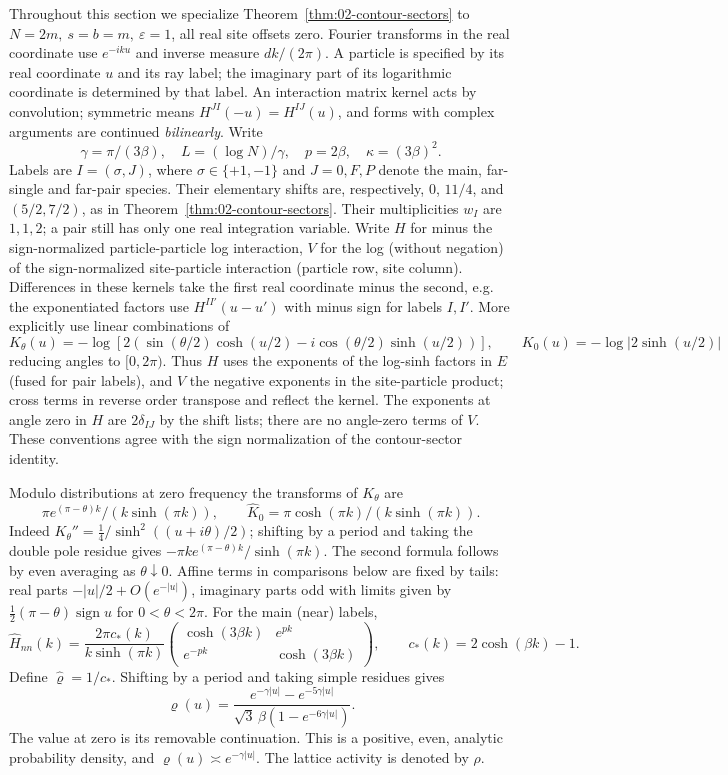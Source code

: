 Throughout this section we specialize Theorem~\ref{thm:02-contour-sectors} to \(N=2m,\ s=b=m,\ \varepsilon=1\), all real site offsets zero. Fourier transforms in the real coordinate use \(e^{-iku}\) and inverse measure \(dk/(2\pi)\). A particle is specified by its real coordinate \(u\) and its ray label; the imaginary part of its logarithmic coordinate is determined by that label. An interaction matrix kernel acts by convolution; symmetric means \(H^{JI}(-u)=H^{IJ}(u)\), and forms with complex arguments are continued \emph{bilinearly}. Write
\[
 \gamma=\pi/(3\beta),\quad L=(\log N)/\gamma,\quad
 p=2\beta,\quad \kappa=(3\beta)^2 .
\]
Labels are \(I=(\sigma,J)\), where \(\sigma\in\{+1,-1\}\) and \(J=0,F,P\) denote the main, far-single and far-pair species. Their elementary shifts are, respectively, \(0\), \(11/4\), and \((5/2,7/2)\), as in Theorem~\ref{thm:02-contour-sectors}. Their multiplicities \(w_I\) are \(1,1,2\); a pair still has only one real integration variable. Write \(H\) for minus the sign-normalized particle-particle log interaction, \(V\) for the log (without negation) of the sign-normalized site-particle interaction (particle row, site column). Differences in these kernels take the first real coordinate minus the second, e.g. the exponentiated factors use \(H^{I I'}(u-u')\) with minus sign for labels \(I,I'\). More explicitly use linear combinations of
\[
 K_\theta(u)=-\log[2(\sin(\theta/2)\cosh(u/2)-i\cos(\theta/2)\sinh(u/2))],\qquad
 K_0(u)=-\log|2\sinh(u/2)|
\]
reducing angles to \([0,2\pi)\). Thus \(H\) uses the exponents of the log-sinh factors in \(E\) (fused for pair labels), and \(V\) the negative exponents in the site-particle product; cross terms in reverse order transpose and reflect the kernel. The exponents at angle zero in \(H\) are \(2\delta_{IJ}\) by the shift lists; there are no angle-zero terms of \(V\). These conventions agree with the sign normalization of the contour-sector identity.

Modulo distributions at zero frequency the transforms of \(K_\theta\) are
\[
 \pi e^{(\pi-\theta)k}/(k\sinh(\pi k)),\qquad
 \widehat K_0=\pi\cosh(\pi k)/(k\sinh(\pi k)).
\]
Indeed \(K_\theta''=\tfrac14/\sinh^2((u+i\theta)/2)\); shifting by a period and taking the double pole residue gives \(-\pi k e^{(\pi-\theta)k}/\sinh(\pi k)\). The second formula follows by even averaging as \(\theta\downarrow0\). Affine terms in comparisons below are fixed by tails: real parts \(-|u|/2+O(e^{-|u|})\), imaginary parts odd with limits given by \(\tfrac12(\pi-\theta)\operatorname{sign}u\) for \(0<\theta<2\pi\). For the main (near) labels,
\[
 \widehat H_{nn}(k)=\frac{2\pi c_*(k)}{k\sinh(\pi k)}
 \begin{pmatrix}\cosh(3\beta k)& e^{pk}\\ e^{-pk}&\cosh(3\beta k)\end{pmatrix},
 \qquad c_*(k)=2\cosh(\beta k)-1.
\]
Define \(\widehat\varrho=1/c_*\). Shifting by a period and taking simple residues gives
\[
 \varrho(u)=\frac{e^{-\gamma|u|}-e^{-5\gamma|u|}}{\sqrt3\,\beta(1-e^{-6\gamma|u|})}.
\]
The value at zero is its removable continuation. This is a positive,
even, analytic probability density, and \(\varrho(u)\asymp
e^{-\gamma|u|}\). The lattice activity is denoted by
\(\rho\).

